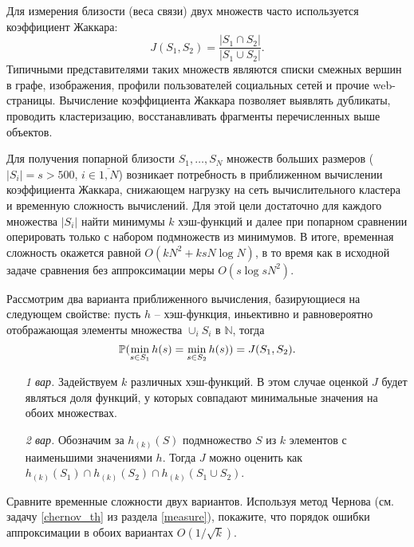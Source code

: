 \begin{problem}
Для измерения близости (веса связи) двух множеств часто используется коэффициент Жаккара:
\[
J(S_1, S_2) = \frac{|S_1 \cap S_2|}{|S_1 \cup S_2|}.
\]
Типичными представителями таких множеств являются списки смежных вершин в графе, изображения, профили пользователей социальных сетей и прочие web-страницы. Вычисление коэффициента Жаккара позволяет выявлять дубликаты, проводить кластеризацию, восстанавливать фрагменты перечисленных выше объектов. 

Для получения попарной близости $S_1, \ldots, S_N$   множеств больших размеров ($|S_i| = s > 500$, $i \in \overline{1,N}$) возникает потребность в приближенном вычислении коэффициента Жаккара, снижающем нагрузку на сеть вычислительного кластера и временную сложность вычислений. Для этой цели достаточно для каждого множества $|S_i|$ найти минимумы $k$ хэш-функций и далее при попарном сравнении оперировать только с набором подмножеств из минимумов. В итоге, временная сложность окажется равной $O(k N^2 + k s N \log N)$, в то время как в исходной задаче сравнения без аппроксимации меры $O(s \log s  N^2)$.

Рассмотрим два варианта приближенного вычисления, базирующиеся на следующем свойстве: пусть $h$ -- хэш-функция, иньективно и равновероятно отображающая элементы множества $\cup_i S_i$ в $\mathbb{N}$, тогда 
 \[
\mathrm{{\mathbb P}}( \min \limits_{s \in S_1} h(s) = \min \limits_{s \in S_2} h(s)) = J(S_1, S_2). 
 \]         
\begin{enumerate}
\item[\textit{1 вар.}] Задействуем $k$ различных хэш-функций. В этом случае оценкой $J$ будет являться доля функций, у которых совпадают минимальные значения на обоих множествах.    
\item[\textit{2 вар.}] Обозначим за $h_{(k)}(S)$ подмножество $S$  из $k$  элементов с наименьшими значениями $h$. Тогда  $J$ можно оценить как $h_{(k)}(S_1) \cap h_{(k)}(S_2) \cap h_{(k)}(S_1 \cup S_2)$.
\end{enumerate}

Сравните временные сложности двух вариантов. Используя метод Чернова  (см. задачу \ref{chernov_th} из раздела \ref{measure}), покажите, что порядок ошибки аппроксимации в обоих вариантах $O(1/ \sqrt{k})$.

\end{problem}


